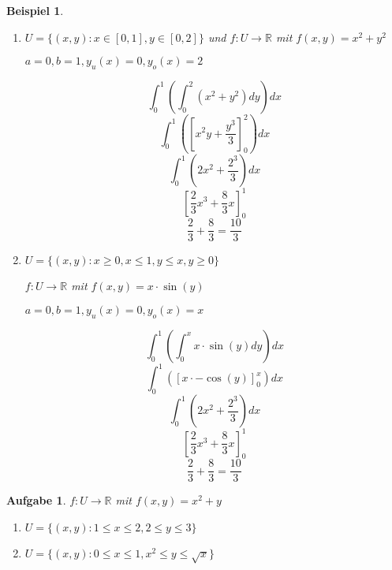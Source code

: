 \documentclass[12pt,a4paper]{scrreprt}
\newtheorem{beispiel}[defi]{Beispiel}
\newtheorem{aufg}[defi]{Aufgabe}
\begin{document}
	\begin{beispiel}
		\begin{enumerate}
			\item $U=\{(x,y):x \in [0,1], y \in [0,2]\}$ und $f:U\to\mathbb{R}$ mit $f(x,y)=x^2+y^2$

				$a=0,b=1,y_u(x)=0,y_o(x)=2$

				\[\int^1_0 \left(\int^{2}_{0} (x^2+y^2)dy\right)dx\]
				\[\int^1_0 \left(\left[x^2y+\frac{y^3}{3}\right]^{2}_{0}\right)dx\]
				\[\int^1_0 \left(2x^2+\frac{2^3}{3}\right)dx\]
				\[\left[\frac{2}{3}x^3+\frac{8}{3}x\right]^1_0\]
				\[\frac{2}{3}+\frac{8}{3}=\frac{10}{3}\]

		\item $U=\{(x,y):x \geq 0, x \leq 1, y \leq x, y \geq 0\}$

			$f:U\to\mathbb{R}$ mit $f(x,y)=x\cdot\sin(y)$

			$a=0,b=1,y_u(x)=0,y_o(x)=x$

			\[\int^1_0 \left(\int^{x}_{0} x\cdot\sin(y)dy\right)dx\]
			\[\int^1_0 \left(\left[x\cdot-\cos(y)\right]^{x}_{0}\right)dx\]
			\[\int^1_0 \left(2x^2+\frac{2^3}{3}\right)dx\]
			\[\left[\frac{2}{3}x^3+\frac{8}{3}x\right]^1_0\]
			\[\frac{2}{3}+\frac{8}{3}=\frac{10}{3}\]
		\end{enumerate}
	\end{beispiel}

	\begin{aufg}
		$f:U\to\mathbb{R}$ mit $f(x,y)=x^2+y$

		\begin{enumerate}
			\item $U=\{(x,y):1 \leq x \leq 2, 2 \leq y \leq 3\}$
			\item $U=\{(x,y):0 \leq x \leq 1, x^2 \leq y \leq \sqrt{x}\}$
		\end{enumerate}
	\end{aufg}
\end{document}
